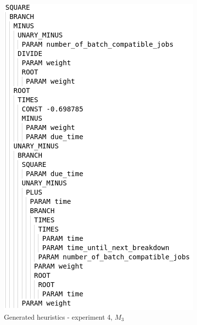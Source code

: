 \begin{figure}[!htbp]
	\centering
	\includegraphics[scale=0.7]{../images/heuristic_04.png}
	\caption{Generated heuristics - experiment 4, $M_3$}
    \label{fig:heuristic_04}
\end{figure}

